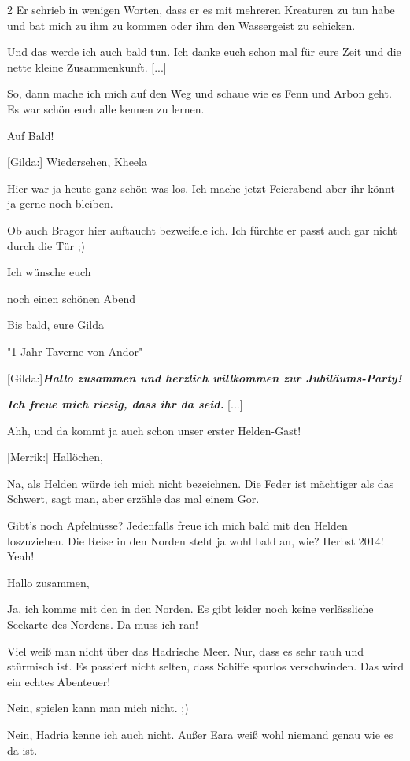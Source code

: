 \documentclass[10pt, a4paper, oneside]{book}
\begin{document}
\begin{multicols}{2}
Er schrieb in wenigen Worten, dass er es mit mehreren Kreaturen zu tun habe und bat mich zu ihm zu kommen oder ihm den Wassergeist zu schicken.

Und das werde ich auch bald tun. Ich danke euch schon mal für eure Zeit und die nette kleine Zusammenkunft. [...]

So, dann mache ich mich auf den Weg und schaue wie es Fenn und Arbon geht.
Es war schön euch alle kennen zu lernen.

Auf Bald!

[Gilda:] Wiedersehen, Kheela

Hier war ja heute ganz schön was los. Ich mache jetzt Feierabend aber ihr könnt ja gerne noch bleiben.

Ob auch Bragor hier auftaucht bezweifele ich. Ich fürchte er passt auch gar nicht durch die Tür ;)

Ich wünsche euch

noch einen schönen Abend

Bis bald, eure Gilda

\begin{center}
    "1 Jahr Taverne von Andor"
\end{center}

[Gilda:]\textbf{\textit{Hallo zusammen und herzlich willkommen zur Jubiläums-Party!}}

\textit{\textbf{Ich freue mich riesig, dass ihr da seid.}} [...]

Ahh, und da kommt ja auch schon unser erster Helden-Gast!

[Merrik:] Hallöchen,

Na, als Helden würde ich mich nicht bezeichnen. Die Feder ist mächtiger als das Schwert, sagt man, aber erzähle das mal einem Gor.

Gibt's noch Apfelnüsse? Jedenfalls freue ich mich bald mit den Helden loszuziehen. Die Reise in den Norden steht ja wohl bald an, wie? Herbst 2014! Yeah!

Hallo zusammen,

Ja, ich komme mit den in den Norden. Es gibt leider noch keine verlässliche Seekarte des Nordens. Da muss ich ran!

Viel weiß man nicht über das Hadrische Meer. Nur, dass es sehr rauh und stürmisch ist. Es passiert nicht selten, dass Schiffe spurlos verschwinden. Das wird ein echtes Abenteuer!

Nein, spielen kann man mich nicht. ;)

Nein, Hadria kenne ich auch nicht. Außer Eara weiß wohl niemand genau wie es da ist.


\end{multicols}
\end{document}
